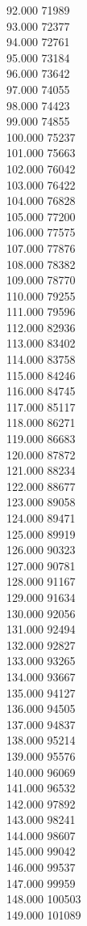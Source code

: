 { 92.000	71989 \\
 93.000	72377 \\
 94.000	72761 \\
 95.000	73184 \\
 96.000	73642 \\
 97.000	74055 \\
 98.000	74423 \\
 99.000	74855 \\
 100.000	75237 \\
 101.000	75663 \\
 102.000	76042 \\
 103.000	76422 \\
 104.000	76828 \\
 105.000	77200 \\
 106.000	77575 \\
 107.000	77876 \\
 108.000	78382 \\
 109.000	78770 \\
 110.000	79255 \\
 111.000	79596 \\
 112.000	82936 \\
 113.000	83402 \\
 114.000	83758 \\
 115.000	84246 \\
 116.000	84745 \\
 117.000	85117 \\
 118.000	86271 \\
 119.000	86683 \\
 120.000	87872 \\
 121.000	88234 \\
 122.000	88677 \\
 123.000	89058 \\
 124.000	89471 \\
 125.000	89919 \\
 126.000	90323 \\
 127.000	90781 \\
 128.000	91167 \\
 129.000	91634 \\
 130.000	92056 \\
 131.000	92494 \\
 132.000	92827 \\
 133.000	93265 \\
 134.000	93667 \\
 135.000	94127 \\
 136.000	94505 \\
 137.000	94837 \\
 138.000	95214 \\
 139.000	95576 \\
 140.000	96069 \\
 141.000	96532 \\
 142.000	97892 \\
 143.000	98241 \\
 144.000	98607 \\
 145.000	99042 \\
 146.000	99537 \\
 147.000	99959 \\
 148.000	100503 \\
 149.000	101089 \\
}
